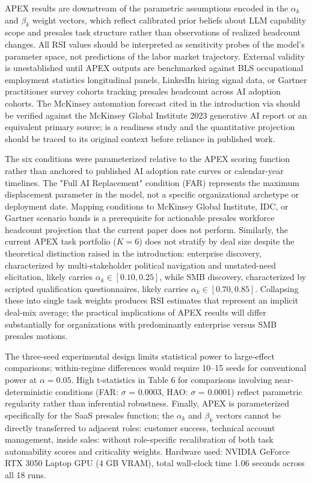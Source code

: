 \documentclass[10pt, conference]{IEEEtran}
\begin{document}
\label{sec:limitations}

APEX results are downstream of the parametric assumptions encoded in the $\alpha_k$ and $\beta_k$ weight vectors, which reflect calibrated prior beliefs about LLM capability scope and presales task structure rather than observations of realized headcount changes. All RSI values should be interpreted as sensitivity probes of the model's parameter space, not predictions of the labor market trajectory. External validity is unestablished until APEX outputs are benchmarked against BLS occupational employment statistics longitudinal panels, LinkedIn hiring signal data, or Gartner practitioner survey cohorts tracking presales headcount across AI adoption cohorts. The McKinsey automation forecast cited in the introduction via \cite{johnk2020ready} should be verified against the McKinsey Global Institute 2023 generative AI report or an equivalent primary source; \cite{johnk2020ready} is a readiness study and the quantitative projection should be traced to its original context before reliance in published work.

The six conditions were parameterized relative to the APEX scoring function rather than anchored to published AI adoption rate curves or calendar-year timelines. The "Full AI Replacement" condition (FAR) represents the maximum displacement parameter in the model, not a specific organizational archetype or deployment date. Mapping conditions to McKinsey Global Institute, IDC, or Gartner scenario bands is a prerequisite for actionable presales workforce headcount projection that the current paper does not perform. Similarly, the current APEX task portfolio ($K = 6$) does not stratify by deal size despite the theoretical distinction raised in the introduction: enterprise discovery, characterized by multi-stakeholder political navigation and unstated-need elicitation, likely carries $\alpha_k \in [0.10, 0.25]$, while SMB discovery, characterized by scripted qualification questionnaires, likely carries $\alpha_k \in [0.70, 0.85]$. Collapsing these into single task weights produces RSI estimates that represent an implicit deal-mix average; the practical implications of APEX results will differ substantially for organizations with predominantly enterprise versus SMB presales motions.

The three-seed experimental design limits statistical power to large-effect comparisons; within-regime differences would require 10--15 seeds for conventional power at $\alpha = 0.05$. High t-statistics in Table 6 for comparisons involving near-deterministic conditions (FAR: $\sigma$ = 0.0003, HAO: $\sigma$ = 0.0001) reflect parametric regularity rather than inferential robustness. Finally, APEX is parameterized specifically for the SaaS presales function; the $\alpha_k$ and $\beta_k$ vectors cannot be directly transferred to adjacent roles: customer success, technical account management, inside sales: without role-specific recalibration of both task automability scores and criticality weights. Hardware used: NVIDIA GeForce RTX 3050 Laptop GPU (4 GB VRAM), total wall-clock time 1.06 seconds across all 18 runs.
\end{document}
